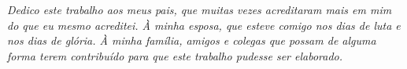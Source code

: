 \documentclass[
	12pt,				%
	openright,			%
	twoside,			%
	a4paper,			%
	english,			%
	spanish,			%
	brazil,				%
	]{abntex2}
\begin{document}
\begin{folhadeaprovacao}
    
\end{folhadeaprovacao}




    
    

      
  




\begin{dedicatoria}
    \vspace*{\fill}
    \centering
    \noindent
    \textit{ Dedico este trabalho aos meus pais, que muitas vezes acreditaram mais em mim do que eu mesmo acreditei. À minha esposa, que esteve comigo nos dias de luta e nos dias de glória. À minha família, amigos e colegas que possam de alguma forma terem contribuído para que este trabalho pudesse ser elaborado.} \vspace*{\fill}
\end{dedicatoria}
\end{document}

